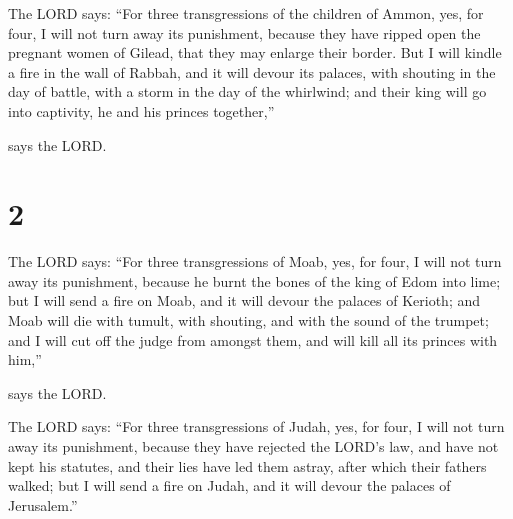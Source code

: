  The LORD says: ``For three transgressions of the
children of Ammon, yes, for four, I will not turn away its punishment,
because they have ripped open the pregnant women of Gilead, that they
may enlarge their border.  But I will kindle a fire in
the wall of Rabbah, and it will devour its palaces, with shouting in the
day of battle, with a storm in the day of the whirlwind; 
and their king will go into captivity, he and his princes together,''

says the LORD.

\hypertarget{section-1}{%
\section{2}\label{section-1}}

 The LORD says: ``For three transgressions of Moab, yes,
for four, I will not turn away its punishment, because he burnt the
bones of the king of Edom into lime;  but I will send a
fire on Moab, and it will devour the palaces of Kerioth; and Moab will
die with tumult, with shouting, and with the sound of the trumpet;
 and I will cut off the judge from amongst them, and will
kill all its princes with him,''

says the LORD.

 The LORD says: ``For three transgressions of Judah, yes,
for four, I will not turn away its punishment, because they have
rejected the LORD's law, and have not kept his statutes, and their lies
have led them astray, after which their fathers walked; 
but I will send a fire on Judah, and it will devour the palaces of
Jerusalem.''

